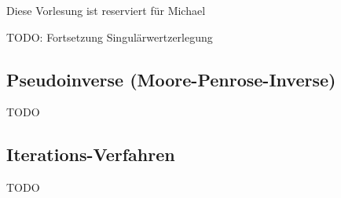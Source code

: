 Diese Vorlesung ist reserviert für Michael

TODO: Fortsetzung Singulärwertzerlegung

\subsection{Pseudoinverse (Moore-Penrose-Inverse)}

TODO

\subsection{Iterations-Verfahren}


TODO

